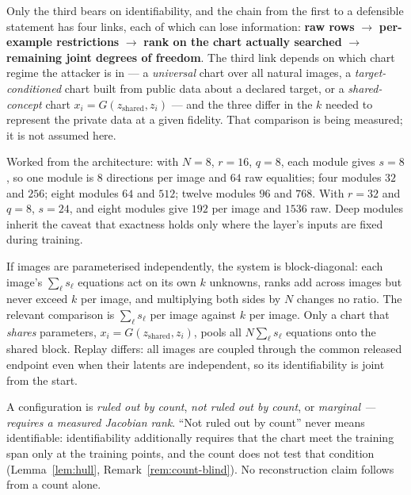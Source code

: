 Only the third bears on identifiability, and the chain from the first to a defensible statement has
four links, each of which can lose information: \textbf{raw rows} $\to$ \textbf{per-example
restrictions} $\to$ \textbf{rank on the chart actually searched} $\to$ \textbf{remaining joint
degrees of freedom}. The third link depends on which chart regime the attacker is in --- a
\emph{universal} chart over all natural images, a \emph{target-conditioned} chart built from public
data about a declared target, or a \emph{shared-concept} chart $x_i=G(z_{\text{shared}},z_i)$ ---
and the three differ in the $k$ needed to represent the private data at a given fidelity. That
comparison is being measured; it is not assumed here.

Worked from the architecture: with $N=8$, $r=16$, $q=8$, each module gives $s=8$, so one module is
$8$ directions per image and $64$ raw equalities; four modules $32$ and $256$; eight modules $64$ and
$512$; twelve modules $96$ and $768$. With $r=32$ and $q=8$, $s=24$, and eight modules give $192$ per
image and $1536$ raw. Deep modules inherit the caveat that exactness holds only where the layer's
inputs are fixed during training.

\begin{remark}[multiplicity]
If images are parameterised independently, the system is block-diagonal: each image's
$\sum_\ell s_\ell$ equations act on its own $k$ unknowns, ranks add across images but never exceed
$k$ per image, and multiplying both sides by $N$ changes no ratio. The relevant comparison is
$\sum_\ell s_\ell$ per image against $k$ per image. Only a chart that \emph{shares} parameters,
$x_i=G(z_{\text{shared}},z_i)$, pools all $N\sum_\ell s_\ell$ equations onto the shared block.
Replay differs: all images are coupled through the common released endpoint even when their latents
are independent, so its identifiability is joint from the start.
\end{remark}

\begin{remark}\label{rem:count-language}
A configuration is \emph{ruled out by count}, \emph{not ruled out by count}, or \emph{marginal ---
requires a measured Jacobian rank}. ``Not ruled out by count'' never means identifiable:
identifiability additionally requires that the chart meet the training span only at the training
points, and the count does not test that condition (Lemma~\ref{lem:hull},
Remark~\ref{rem:count-blind}). No reconstruction claim follows from a count alone.
\end{remark}


